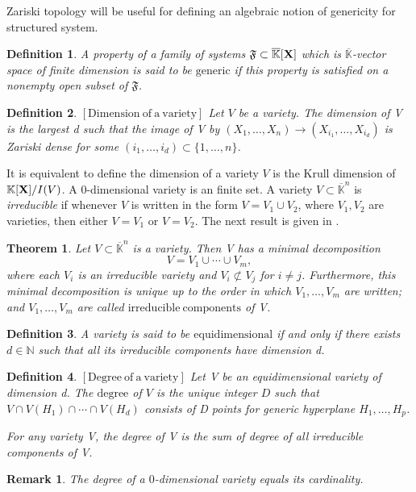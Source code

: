 \documentclass[11pt]{article}
\numberwithin{Property}{section}
\newtheorem{Theorem}{Theorem}%
\numberwithin{Theorem}{section}
\numberwithin{Proposition}{section}
\numberwithin{Lemma}{section}
\numberwithin{Corollary}{section}
\newtheorem{Definition}{Definition}%
\numberwithin{Definition}{section}
\newtheorem{Remark}{Remark}%
\numberwithin{Remark}{section}
\numberwithin{Conjecture}{section}
\numberwithin{Problem}{section}
\numberwithin{Example}{section}
\numberwithin{Claim}{section}
\def\bar{\overline}
\newcommand{\field}{\mathbb{K}} %
\newcommand{\mat}[1]{\mathbf{\MakeUppercase{#1}}} %
\begin{document}
Zariski topology will be useful for defining an algebraic notion of genericity for structured system. 
\begin{Definition} A property of a family of systems $\mathfrak{F} \subset \bar{\field}[\mat{X}]$ which is $\bar{\field}$-vector space of finite dimension is said to be $\mathrm{generic}$ if this property is satisfied on a nonempty open subset of $\mathfrak{F}$.
\end{Definition}
\begin{Definition}$\mathrm{[Dimension \ of \ a \ variety]}$ Let $V$ be a variety. The dimension of V is the largest d such that the image of V by $(X_1, \ldots, X_n) \to (X_{i_1}, \ldots, X_{i_d})$ is Zariski dense for some $(i_1, \ldots, i_d) \subset \{1, \ldots, n\}$.
\end{Definition}
It is equivalent to define the dimension of a variety $V$ is the Krull dimension of $\field[\mat{X}]/I(V)$. A $0$-dimensional variety is an finite set. A variety $V \subset \bar{\field}^n$ is \emph{irreducible} if whenever $V$ is written in the form $V = V_1 \cup V_2$, where $V_1, V_2$ are varieties, then either $V = V_1$ or $V = V_2$. The next result is given in \cite[Theorem~4 -- section~6 -- chapter~4]{Cox07}.
\begin{Theorem} Let $V \subset \bar{\field}^{n}$ is a variety. Then V has a minimal decomposition 
\[
V = V_1 \cup \cdots \cup V_m,
\] where each $V_i$ is an irreducible variety and $V_i \not\subset V_j$ for $i \ne j$. Furthermore, this minimal decomposition is unique up to the order in which $V_1, \ldots, V_m$ are written; and $V_1, \ldots, V_m$ are called $\mathrm{irreducible \ components}$ of V.
\end{Theorem}
\begin{Definition} A variety is said to be $\mathrm{equidimensional}$ if and only if there exists $d \in \mathbb{N}$ such that all its irreducible components have dimension d. 
\end{Definition}
\begin{Definition}$\mathrm{[Degree \ of \ a \ variety]}$ Let V be an equidimensional variety of dimension d. The $\mathrm{degree}$ of $V$ is the unique integer $D$ such that $V \cap V(H_1) \cap \cdots \cap V(H_d)$ consists of D points for generic hyperplane $H_1, \ldots, H_p$. 

For any variety V, the degree of V is the sum of degree of all irreducible components of V. 
\end{Definition}
\begin{Remark} The degree of a $0$-dimensional variety equals its cardinality.
\end{Remark}
\end{document}
